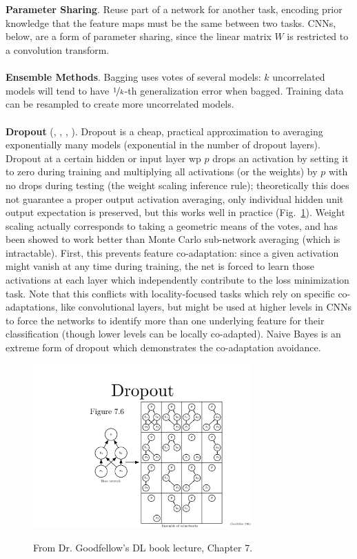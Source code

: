 \documentclass{article}
\begin{document}
\\\\
\noindent
\textbf{Parameter Sharing}. Reuse part of a network for another task, encoding prior knowledge that the feature maps must be the same between two tasks. CNNs, below, are a form of parameter sharing, since the linear matrix $W$ is restricted to a convolution transform.
\\\\
\noindent
\textbf{Ensemble Methods}. Bagging uses votes of several models: $k$ uncorrelated models will tend to have $\nicefrac{1}{k}$-th generalization error when bagged. Training data can be resampled to create more uncorrelated models.
\\\\
\noindent
\textbf{Dropout} (, , , ). Dropout is a cheap, practical approximation to averaging exponentially many models (exponential in the number of dropout layers). Dropout at a certain hidden or input layer wp $p$ drops an activation by setting it to zero during training and multiplying all activations (or the weights) by $p$ with no drops during testing (the weight scaling inference rule); theoretically this does not guarantee a proper output activation averaging, only individual hidden unit output expectation is preserved, but this works well in practice (Fig.~\ref{fig:dropout}). Weight scaling actually corresponds to taking a geometric means of the votes, and has been showed to work better than Monte Carlo sub-network averaging (which is intractable). First, this prevents feature co-adaptation: since a given activation might vanish at any time during training, the net is forced to learn those activations at each layer which independently contribute to the loss minimization task. Note that this conflicts with locality-focused tasks which rely on specific co-adaptations, like convolutional layers, but might be used at higher levels in CNNs to force the networks to identify more than one underlying feature for their classification (though lower levels can be locally co-adapted). Naive Bayes is an extreme form of dropout which demonstrates the co-adaptation avoidance.
\begin{figure}[!h]
\centering
{\includegraphics[width=0.75\textwidth]{dropout.pdf}}
  \caption{From Dr. Goodfellow's DL book lecture, Chapter 7.}
\label{fig:dropout}
\end{figure}
\end{document}
